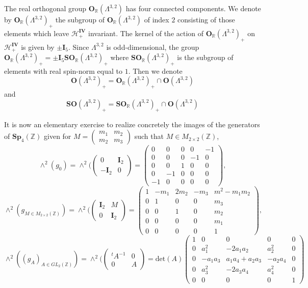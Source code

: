 \documentclass[9pt]{amsart} \usepackage[utf8]{inputenc}
\newcommand{\Z}{\mathbb{Z}} \newcommand{\C}{\mathbb{C}}
\newcommand{\R}{\mathbb{R}} \newcommand{\La}{\Lambda}
\newcommand{\Sp}{\mathbf{Sp}}
\newcommand{\Orth}{\mathbf{O}}
\newcommand{\SO}{\mathbf{SO}}
\newcommand{\Hpl}{\mathcal{H}}
\newcommand{\IV}{\mathbf{IV}}
\newcommand{\Id}{\mathbf{I}}
\begin{document}
The real orthogonal group $\Orth_{\R}(\La^{3,2})$ has four connected
components. We denote by $\Orth_{\R}(\La^{3,2})_+$ the subgroup of
$\Orth_{\R}(\La^{3,2})$ of index $2$ consisting of those elements which
leave $\Hpl_+^{\IV}$ invariant. The kernel of the action of
$\Orth_{\R}(\La^{3,2})_+$ on $\Hpl_+^{\IV}$ is given by $\pm \Id_5$. Since
$\La^{3,2}$ is odd-dimensional, the group $\Orth_{\R}(\La^{3,2})_+ =
\pm\Id_5\SO_{\R}(\La^{3,2})_+$ where $\SO_{\R}(\La^{3,2})_+$ is the
subgroup of elements with real spin-norm equal to $1$. Then we denote
$$\Orth(\La^{3,2})_+ = \Orth_{\R}(\La^{3,2})_+ \cap \Orth(\La^{3,2})$$
and $$\SO(\La^{3,2})_+ = \SO_{\R}(\La^{3,2})_+ \cap \Orth(\La^{3,2})$$

It is now an elementary exercise to realize concretely the images of the
generators of $\Sp_4(\Z)$ given for $M=\begin{pmatrix} m_1 & m_2\\
m_2 & m_3\end{pmatrix}$ such that $M \in M_{2\times2}(\Z)$,
$$\wedge^2(g_0) = \wedge^2(\begin{pmatrix}0 & \Id_2 \\ -\Id_2 &
0\end{pmatrix} = \begin{pmatrix}
0 & 0 & 0 & 0 & -1\\
0 & 0 & 0 & -1 & 0\\
0 & 0 & 1 & 0 & 0\\
0 & -1 & 0 & 0 & 0\\
-1 & 0 & 0 & 0 & 0
\end{pmatrix},$$
$$\wedge^2(g_{M \in M_{2\times2}(\Z)}) = \wedge^2(\begin{pmatrix}\Id_2 & M\\ 0 &
\Id_2\end{pmatrix} = \begin{pmatrix}1 & -m_1 & 2m_2 & -m_3 & m^2 - m_1 m_2\\
0 & 1 & 0 & 0 & m_3\\
0 & 0 & 1 & 0 & m_2\\
0 & 0 & 0 & 0 & m_1\\
0 & 0 & 0 & 0 & 1\end{pmatrix},$$
$$\wedge^2((g_A)_{A\in GL_2(\Z)}) = \wedge^2(\begin{pmatrix}{}^tA^{-1} &
0\\0 & A\end{pmatrix} = \text{det}(A)\begin{pmatrix}1 & 0 & 0 & 0 & 0\\
0 & a_1^2 & -2a_1a_2 & a_2^2 & 0\\
0 & -a_1a_3 & a_1a_4 + a_2a_3 & -a_2a_4 & 0\\
0 & a_3^2 & -2a_3a_4 & a_4^2 & 0\\
0 & 0 & 0 & 0 & 1\end{pmatrix}$$
\end{document}

